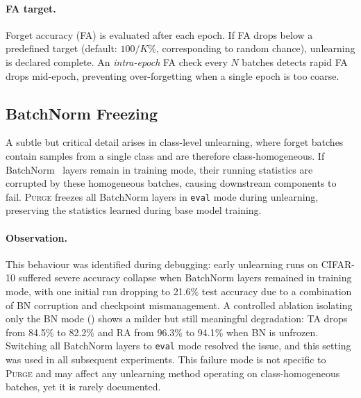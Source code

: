 \documentclass{article}
\newcommand{\ours}{\textsc{Purge}}
\begin{document}
\paragraph{FA target.}
Forget accuracy (FA) is evaluated after each epoch.
If FA drops below a predefined target (default: $100/K$\%, corresponding to random chance), unlearning is declared complete.
An \emph{intra-epoch} FA check every $N$ batches detects rapid FA drops mid-epoch, preventing over-forgetting when a single epoch is too coarse.

\subsection{BatchNorm Freezing}

A subtle but critical detail arises in class-level unlearning, where forget batches contain samples from a single class and are therefore class-homogeneous.
If BatchNorm~\cite{ioffe2015batchnorm} layers remain in training mode, their running statistics are corrupted by these homogeneous batches, causing downstream components to fail.
\ours{} freezes all BatchNorm layers in \texttt{eval} mode during unlearning, preserving the statistics learned during base model training.

\paragraph{Observation.}
This behaviour was identified during debugging: early unlearning runs on CIFAR-10 suffered severe accuracy collapse when BatchNorm layers remained in training mode, with one initial run dropping to 21.6\% test accuracy due to a combination of BN corruption and checkpoint mismanagement.
A controlled ablation isolating only the BN mode () shows a milder but still meaningful degradation: TA drops from 84.5\% to 82.2\% and RA from 96.3\% to 94.1\% when BN is unfrozen.
Switching all BatchNorm layers to \texttt{eval} mode resolved the issue, and this setting was used in all subsequent experiments.
This failure mode is not specific to \ours{} and may affect any unlearning method operating on class-homogeneous batches, yet it is rarely documented.
\end{document}

